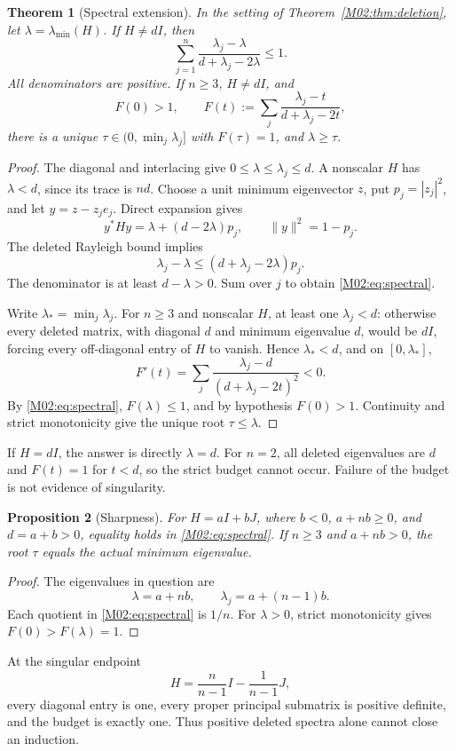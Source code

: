 \documentclass[11pt,a4paper,oneside]{report}
\newtheorem{theorem}{Theorem}[section]
\newtheorem{proposition}[theorem]{Proposition}
\theoremstyle{definition}
\theoremstyle{remark}
\begin{document}
\begin{theorem}[Spectral extension]\label{M02:thm:spectral}
In the setting of Theorem~\ref{M02:thm:deletion}, let \(\lambda=\lambda_{\min}(H)\). If \(H\ne dI\), then
\begin{equation}\label{M02:eq:spectral}
\boxed{\ \sum_{j=1}^n
\frac{\lambda_j-\lambda}{d+\lambda_j-2\lambda}\le1.\ }
\end{equation}
All denominators are positive. If \(n\ge3\), \(H\ne dI\), and
\[
F(0)>1,\qquad
F(t):=\sum_j\frac{\lambda_j-t}{d+\lambda_j-2t},
\]
there is a unique \(\tau\in(0,\min_j\lambda_j]\) with \(F(\tau)=1\), and \(\lambda\ge\tau\).
\end{theorem}
\begin{proof}
The diagonal and interlacing give \(0\le\lambda\le\lambda_j\le d\). A nonscalar \(H\) has \(\lambda<d\), since its trace is \(nd\). Choose a unit minimum eigenvector \(z\), put \(p_j=|z_j|^2\), and let \(y=z-z_je_j\). Direct expansion gives
\[
y^*Hy=\lambda+(d-2\lambda)p_j,\qquad \|y\|^2=1-p_j.
\]
The deleted Rayleigh bound implies
\[
\lambda_j-\lambda\le(d+\lambda_j-2\lambda)p_j.
\]
The denominator is at least \(d-\lambda>0\). Sum over \(j\) to obtain \eqref{M02:eq:spectral}.

Write \(\lambda_*=\min_j\lambda_j\). For \(n\ge3\) and nonscalar \(H\), at least one \(\lambda_j<d\): otherwise every deleted matrix, with diagonal \(d\) and minimum eigenvalue \(d\), would be \(dI\), forcing every off-diagonal entry of \(H\) to vanish. Hence \(\lambda_*<d\), and on \([0,\lambda_*]\),
\[
F'(t)=\sum_j\frac{\lambda_j-d}{(d+\lambda_j-2t)^2}<0.
\]
By \eqref{M02:eq:spectral}, \(F(\lambda)\le1\), and by hypothesis \(F(0)>1\). Continuity and strict monotonicity give the unique root \(\tau\le\lambda\).
\end{proof}
If \(H=dI\), the answer is directly \(\lambda=d\). For \(n=2\), all deleted eigenvalues are \(d\) and \(F(t)=1\) for \(t<d\), so the strict budget cannot occur. Failure of the budget is not evidence of singularity.

\begin{proposition}[Sharpness]\label{M02:prop:sharp}
For \(H=aI+bJ\), where \(b<0\), \(a+nb\ge0\), and \(d=a+b>0\), equality holds in \eqref{M02:eq:spectral}. If \(n\ge3\) and \(a+nb>0\), the root \(\tau\) equals the actual minimum eigenvalue.
\end{proposition}
\begin{proof}
The eigenvalues in question are
\[
\lambda=a+nb,\qquad \lambda_j=a+(n-1)b.
\]
Each quotient in \eqref{M02:eq:spectral} is \(1/n\). For \(\lambda>0\), strict monotonicity gives \(F(0)>F(\lambda)=1\).
\end{proof}
At the singular endpoint
\[
H=\frac n{n-1}I-\frac1{n-1}J,
\]
every diagonal entry is one, every proper principal submatrix is positive definite, and the budget is exactly one. Thus positive deleted spectra alone cannot close an induction.
\end{document}
